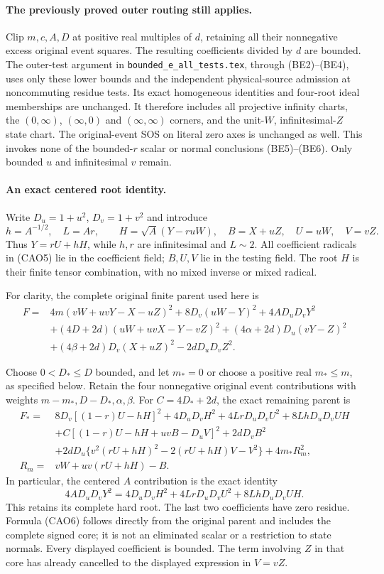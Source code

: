 \paragraph{The previously proved outer routing still applies.}
Clip $m,c,A,D$ at positive real multiples of $d$, retaining all their
nonnegative excess original event squares. The resulting coefficients
divided by $d$ are bounded. The outer-test argument in
\texttt{bounded\_e\_all\_tests.tex}, through (BE2)--(BE4), uses only
these lower bounds and the independent physical-source admission at
noncommuting residue tests. Its exact homogeneous identities and
four-root ideal memberships are unchanged. It therefore includes all
projective infinity charts, the $(0,\infty)$, $(\infty,0)$ and
$(\infty,\infty)$ corners, and the unit-$W$, infinitesimal-$Z$ state
chart. The original-event SOS on literal zero axes is unchanged as
well. This invokes none of the bounded-$r$ scalar or normal conclusions
(BE5)--(BE6). Only bounded $u$ and infinitesimal $v$ remain.

\paragraph{An exact centered root identity.}
Write $D_u=1+u^2$, $D_v=1+v^2$ and introduce
\[
 h=A^{-1/2},\quad L=Ar,\qquad
 H=\sqrt A(Y-ruW),\quad B=X+uZ,\quad U=uW,\quad V=vZ.
 \tag{CAO5}
\]
Thus $Y=rU+hH$, while $h,r$ are infinitesimal and $L\sim2$.
All coefficient radicals in (CAO5) lie in the coefficient field;
$B,U,V$ lie in the testing field. The root $H$ is their finite tensor
combination, with no mixed inverse or mixed radical.

For clarity, the complete original finite parent used here is
\begin{align*}
F={}&4m(vW+uvY-X-uZ)^2+8D_v(uW-Y)^2
       +4AD_uD_vY^2\\
 &+(4D+2d)(uW+uvX-Y-vZ)^2
   +(4\alpha+2d)D_u(vY-Z)^2\\
 &+(4\beta+2d)D_v(X+uZ)^2-2dD_uD_vZ^2.
\end{align*}

Choose $0<D_*\le D$ bounded, and let $m_*=0$ or choose a positive
real $m_*\le m$, as specified below. Retain the four nonnegative
original event contributions with weights $m-m_*,D-D_*,\alpha,\beta$.
For $C=4D_*+2d$, the exact remaining parent is
\begin{align*}
F_*={}&8D_v[(1-r)U-hH]^2
 +4D_uD_vH^2+4LrD_uD_vU^2+8LhD_uD_vUH\\
&+C[(1-r)U-hH+uvB-D_uV]^2+2dD_vB^2\\
&+2dD_u\{v^2(rU+hH)^2-2(rU+hH)V-V^2\}
 +4m_*R_m^2,                                      \tag{CAO6}\\
R_m={}&vW+uv(rU+hH)-B.
\end{align*}
In particular, the centered $A$ contribution is the exact identity
\[
 4AD_uD_vY^2
 =4D_uD_vH^2+4LrD_uD_vU^2+8LhD_uD_vUH.
\]
This retains its complete hard root. The last two coefficients have
zero residue. Formula (CAO6) follows directly from the original parent
and includes the complete signed core; it is not an eliminated scalar
or a restriction to state normals. Every displayed coefficient is
bounded. The term involving $Z$ in that core has already cancelled
to the displayed expression in $V=vZ$.

